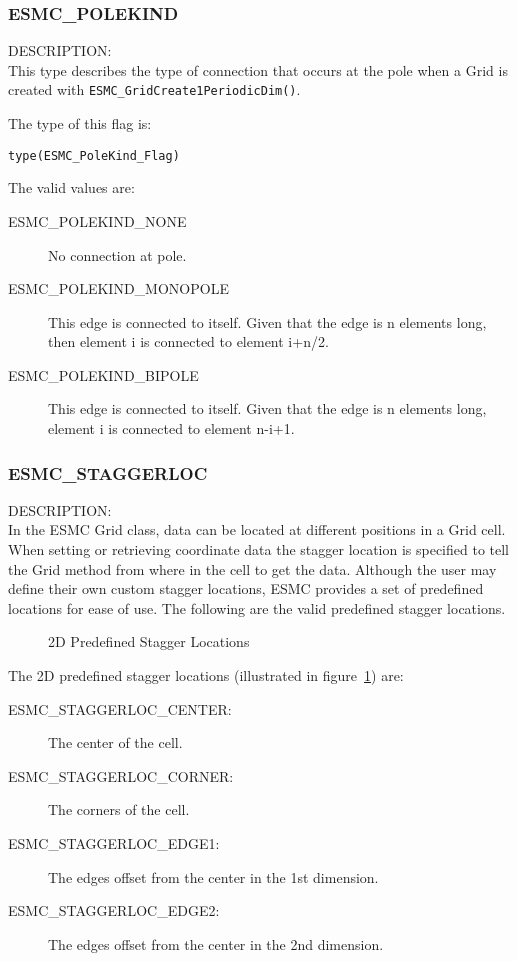 \subsubsection{ESMC\_POLEKIND}
\label{const:cpolekind}

{\sf DESCRIPTION:\\}
This type describes the type of connection that occurs at the pole when a Grid is 
created with {\tt ESMC\_GridCreate1PeriodicDim()}.

The type of this flag is:

{\tt type(ESMC\_PoleKind\_Flag)}

The valid values are:
\begin{description}
\item [ESMC\_POLEKIND\_NONE] No connection at pole.

\item [ESMC\_POLEKIND\_MONOPOLE] This edge is connected to itself. Given
that the edge is n elements long, then element i is connected to
element i+n/2.

\item [ESMC\_POLEKIND\_BIPOLE] This edge is connected to itself. Given
that the edge is n elements long, element i is connected to element n-i+1.
\end{description}


\subsubsection{ESMC\_STAGGERLOC}
\label{const:cstaggerloc}

 {\sf DESCRIPTION:\\}
 In the ESMC Grid class, data can be located at different positions in a
 Grid cell.  When setting or retrieving coordinate data the stagger location is
 specified to tell the Grid method  from where in the cell to get the data. 
 Although the user may define their own custom stagger locations, 
 ESMC provides a set of predefined locations for ease of use. The
following are the valid predefined stagger locations. 

\medskip

\begin{center}
\begin{figure}
\center
{}
\caption{2D Predefined Stagger Locations}
\label{fig:gridstaggerloc2d}
\end{figure}
\end{center}

The 2D predefined stagger locations (illustrated in figure~\ref{fig:gridstaggerloc2d}) are:\\
\begin{description}
\item [ESMC\_STAGGERLOC\_CENTER:] The center of the cell.
\item [ESMC\_STAGGERLOC\_CORNER:] The corners of the cell.
\item [ESMC\_STAGGERLOC\_EDGE1:] The edges offset from the center in the 1st dimension.
\item [ESMC\_STAGGERLOC\_EDGE2:] The edges offset from the center in the 2nd dimension.
\end{description}

